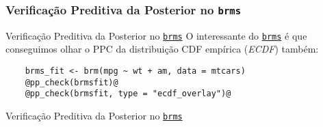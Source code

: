 \subsubsection{Verificação Preditiva da Posterior no \texttt{brms}}
\begin{frame}[fragile]{Verificação Preditiva da Posterior no \href{https://paul-buerkner.github.io/brms/}{\texttt{brms}}}
    O interessante do \href{https://paul-buerkner.github.io/brms/}{\texttt{brms}} é
    que conseguimos olhar o PPC da distribuição CDF empírica (\textit{ECDF}) também:
    \vfill
    \begin{lstlisting}
    brms_fit <- brm(mpg ~ wt + am, data = mtcars)
    @pp_check(brmsfit)@
    @pp_check(brmsfit, type = "ecdf_overlay")@
    \end{lstlisting}
\end{frame}

\begin{frame}{Verificação Preditiva da Posterior no \href{https://paul-buerkner.github.io/brms/}{\texttt{brms}}}
\begin{columns}
    \begin{column}{0.5\textwidth}
        \begin{figure}
            \centering
            \resizebox{0.8\columnwidth}{!}{}
        \end{figure}
    \end{column}
    \begin{column}{0.5\textwidth}
        \begin{figure}
        \centering
            \resizebox{0.8\columnwidth}{!}{}
        \end{figure}
    \end{column}
\end{columns}
\end{frame}
